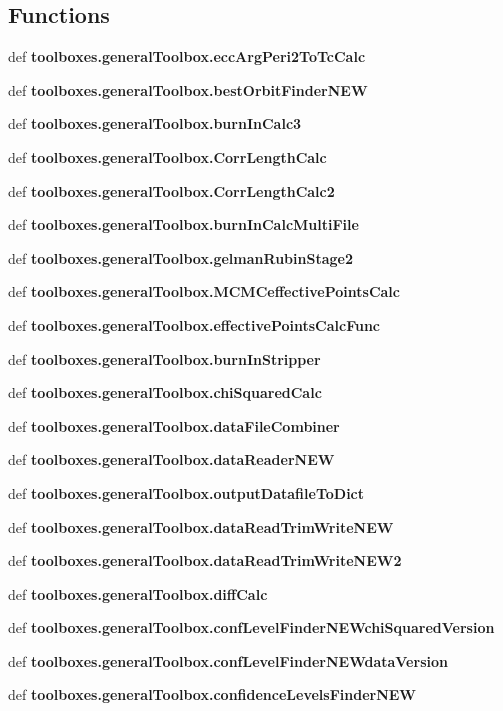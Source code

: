 \subsection*{Functions}
\begin{DoxyCompactItemize}
\item 
def {\bf toolboxes.\-general\-Toolbox.\-ecc\-Arg\-Peri2\-To\-Tc\-Calc}
\item 
def {\bf toolboxes.\-general\-Toolbox.\-best\-Orbit\-Finder\-N\-E\-W}
\item 
def {\bf toolboxes.\-general\-Toolbox.\-burn\-In\-Calc3}
\item 
def {\bf toolboxes.\-general\-Toolbox.\-Corr\-Length\-Calc}
\item 
def {\bf toolboxes.\-general\-Toolbox.\-Corr\-Length\-Calc2}
\item 
def {\bf toolboxes.\-general\-Toolbox.\-burn\-In\-Calc\-Multi\-File}
\item 
def {\bf toolboxes.\-general\-Toolbox.\-gelman\-Rubin\-Stage2}
\item 
def {\bf toolboxes.\-general\-Toolbox.\-M\-C\-M\-Ceffective\-Points\-Calc}
\item 
def {\bf toolboxes.\-general\-Toolbox.\-effective\-Points\-Calc\-Func}
\item 
def {\bf toolboxes.\-general\-Toolbox.\-burn\-In\-Stripper}
\item 
def {\bf toolboxes.\-general\-Toolbox.\-chi\-Squared\-Calc}
\item 
def {\bf toolboxes.\-general\-Toolbox.\-data\-File\-Combiner}
\item 
def {\bf toolboxes.\-general\-Toolbox.\-data\-Reader\-N\-E\-W}
\item 
def {\bf toolboxes.\-general\-Toolbox.\-output\-Datafile\-To\-Dict}
\item 
def {\bf toolboxes.\-general\-Toolbox.\-data\-Read\-Trim\-Write\-N\-E\-W}
\item 
def {\bf toolboxes.\-general\-Toolbox.\-data\-Read\-Trim\-Write\-N\-E\-W2}
\item 
def {\bf toolboxes.\-general\-Toolbox.\-diff\-Calc}
\item 
def {\bf toolboxes.\-general\-Toolbox.\-conf\-Level\-Finder\-N\-E\-Wchi\-Squared\-Version}
\item 
def {\bf toolboxes.\-general\-Toolbox.\-conf\-Level\-Finder\-N\-E\-Wdata\-Version}
\item 
def {\bf toolboxes.\-general\-Toolbox.\-confidence\-Levels\-Finder\-N\-E\-W}
\item 

\end{DoxyCompactItemize}
